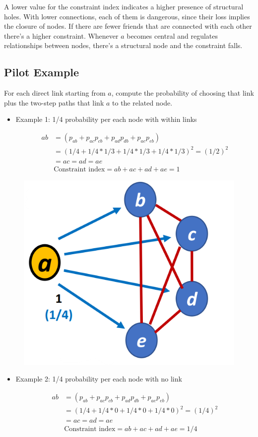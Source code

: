 \documentclass[
  notitlepage,
  onecolumn,
  openany]{book}
\begin{document}
A lower value for the constraint index indicates a higher presence of structural holes. With lower connections, each of them is dangerous, since their loss implies the closure of nodes. If there are fewer friends that are connected with each other there's a higher constraint. Whenever \(a\) becomes central and regulates relationships between nodes, there's a structural node and the constraint falls.

\hypertarget{pilot-example}{%
\subsection{Pilot Example}\label{pilot-example}}

For each direct link starting from \(a\), compute the probability of choosing that link plus the two-step paths that link \(a\) to the related node.

\begin{itemize}
\item
  Example 1: 1/4 probability per each node with within links

  \[
    \begin{aligned}
    ab &= (p_{ab}+p_{ac}p_{cb}+p_{ad}p_{db}+p_{ae}p_{eb})
    \\&= (1/4+1/4*1/3+1/4*1/3+1/4*1/3)^2 =(1/2)^2 \\
    & = ac = ad = ae\\
    &\text{Constraint index} = ab+ac+ad+ae = 1
    \end{aligned}
    \]
\end{itemize}

\begin{figure}[h!]

{\centering \includegraphics[width=0.4\linewidth]{images/08-Metrics for structural holes/Untitled} 

}

\end{figure}

\begin{itemize}
\item
  Example 2: 1/4 probability per each node with no link

  \[
    \begin{aligned}
    ab &= (p_{ab}+p_{ac}p_{cb}+p_{ad}p_{db}+p_{ae}p_{eb})
    \\&= (1/4+1/4*0+1/4*0+1/4*0)^2 =(1/4)^2 \\
    & = ac = ad = ae\\
    &\text{Constraint index} = ab+ac+ad+ae = 1/4
    \end{aligned}
    \]
\end{itemize}
\end{document}
